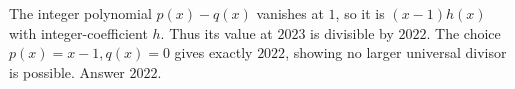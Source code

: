 The integer polynomial $p(x)-q(x)$ vanishes at $1$, so it is $(x-1)h(x)$ with integer-coefficient $h$. Thus its value at $2023$ is divisible by $2022$. The choice $p(x)=x-1,q(x)=0$ gives exactly $2022$, showing no larger universal divisor is possible. Answer $\boxed{2022}$.
